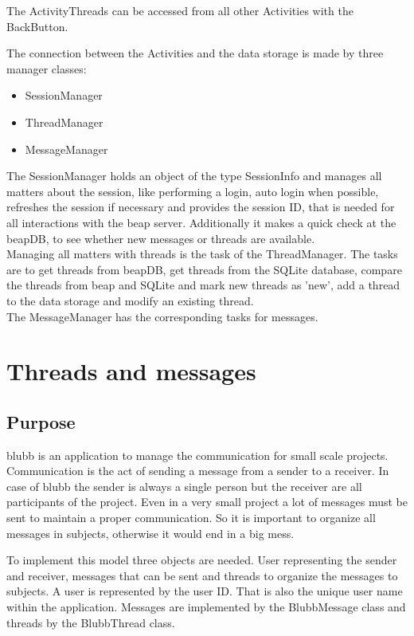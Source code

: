 \documentclass[12pt,a4paper,oneside]{report}
\newcommand{\appname}{blubb}
\newcommand{\beapDB}{beapDB}
\newcommand{\beapServer}{beap server}
\begin{document}
The ActivityThreads can be accessed from all other Activities with the BackButton.


The connection between the Activities and the data storage is made by three manager classes:
\begin{itemize}
\item{SessionManager}
\item{ThreadManager}
\item{MessageManager}
\end{itemize}

The SessionManager holds an object of the type SessionInfo and manages all matters about the session, like performing a login, auto login when possible, refreshes the session if necessary and provides the session ID, that is needed for all interactions with the \beapServer{}. Additionally it makes a quick check at the \beapDB{}, to see whether new messages or threads are available.\\

Managing all matters with threads is the task of the ThreadManager. The tasks are to get threads from \beapDB{}, get threads from the SQLite database, compare the threads from beap and SQLite and mark new threads as 'new', add a thread to the data storage and modify an existing thread. \\

The MessageManager has the corresponding tasks for messages. 
\section{Threads and messages}
\subsection{Purpose}
\appname{} is an application to manage the communication for small scale projects. Communication is the act of sending a message from a sender to a receiver. In case of \appname{} the sender is always a single person but the receiver are all participants of the project. Even in a very small project a lot of messages must be sent to maintain a proper communication. So it is important to organize all messages in subjects, otherwise it would end in a big mess.


To implement this model three objects are needed. User representing the sender and receiver, messages that can be sent and threads to organize the messages to subjects. A user is represented by the user ID. That is also the unique user name within the application. Messages are implemented by the BlubbMessage class and threads by the BlubbThread class.
\end{document}
